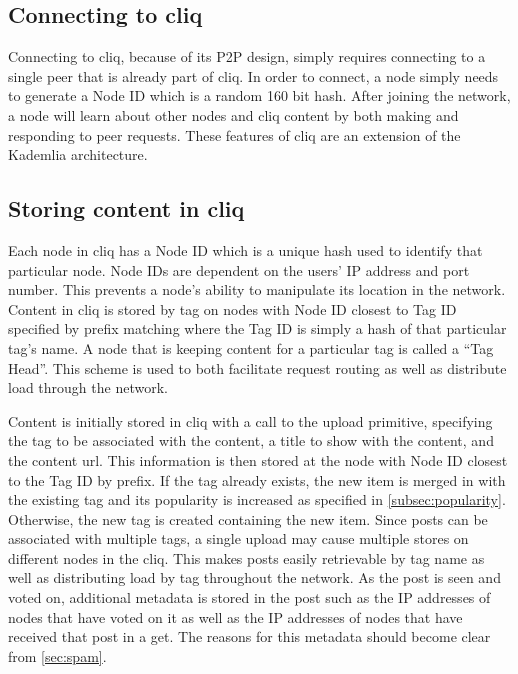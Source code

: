 \documentclass{sig-alternate}
\begin{document}
\subsection{Connecting to cliq}

Connecting to cliq, because of its P2P design, simply requires connecting to a single peer that is already part of cliq. 
In order to connect, a node simply needs to generate a Node ID which is a random 160 bit hash. 
After joining the network, a node will learn about other nodes and cliq content by both making and responding to peer requests. 
These features of cliq are an extension of the Kademlia architecture.

\subsection{Storing content in cliq}
\label{subsec:upload}

Each node in cliq has a Node ID which is a unique hash used to
identify that particular node. Node IDs are dependent on the users' IP
address and port number. This prevents a node's ability to manipulate
its location in the network.  Content in cliq is stored by tag on
nodes with Node ID closest to Tag ID specified by prefix matching
where the Tag ID is simply a hash of that particular tag's name. A
node that is keeping content for a particular tag is called a ``Tag
Head''. This scheme is used to both facilitate request routing as
well as distribute load through the network.

Content is initially stored in cliq with a call to the upload primitive, specifying the tag to be associated with the content, a title to show with the content, and the content url. 
This information is then stored at the node with Node ID closest to the Tag ID by prefix. 
If the tag already exists, the new item is merged in with the existing tag and its popularity is increased as specified in \ref{subsec:popularity}. 
Otherwise, the new tag is created containing the new item. 
Since posts can be associated with multiple tags, a single upload may cause multiple stores on different nodes in the cliq. 
This makes posts easily retrievable by tag name as well as distributing load by tag throughout the network. 
As the post is seen and voted on, additional metadata is stored in the post such as the IP addresses of nodes that have voted on it as well as the IP addresses of nodes that have received that post in a get. 
The reasons for this metadata should become clear from \ref{sec:spam}. 
\end{document}
